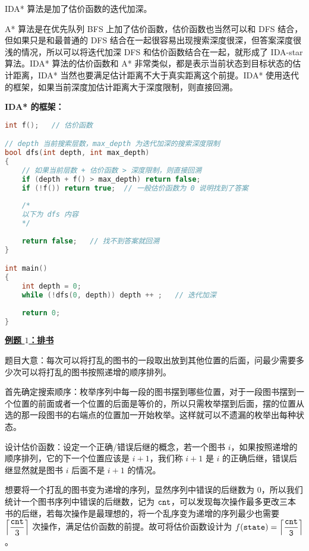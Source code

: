

IDA* 算法是加了估价函数的迭代加深。

A* 算法是在优先队列 BFS 上加了估价函数，估价函数也当然可以和 DFS 结合，但如果只是和最普通的 DFS 结合在一起很容易出现搜索深度很深，但答案深度很浅的情况，所以可以将迭代加深 DFS 和估价函数结合在一起，就形成了 IDA-star 算法。IDA* 算法的估价函数和 A* 非常类似，都是表示当前状态到目标状态的估计距离，IDA* 当然也要满足估计距离不大于真实距离这个前提。IDA* 使用迭代的框架，如果当前深度加估计距离大于深度限制，则直接回溯。

\textbf{IDA* 的框架：}
\begin{lstlisting}[language=cpp]
int f();   // 估价函数

// depth 当前搜索层数，max_depth 为迭代加深的搜索深度限制
bool dfs(int depth, int max_depth)  
{
    // 如果当前层数 + 估价函数 > 深度限制，则直接回溯
    if (depth + f() > max_depth) return false; 
    if (!f()) return true;  // 一般估价函数为 0 说明找到了答案
    
    /*
    以下为 dfs 内容
    */
    
    return false;   // 找不到答案就回溯
}

int main()
{
    int depth = 0;
    while (!dfs(0, depth)) depth ++ ;   // 迭代加深
    
    return 0;
}
\end{lstlisting}

\textbf{\href{http://poj.org/problem?id=3460}{例题 $1$：排书}}

题目大意：每次可以将打乱的图书的一段取出放到其他位置的后面，问最少需要多少次可以将打乱的图书按照递增的顺序排列。

首先确定搜索顺序：枚举序列中每一段的图书摆到哪些位置，对于一段图书摆到一个位置的前面或者一个位置的后面是等价的，所以只需枚举摆到后面，摆的位置从选的那一段图书的右端点的位置加一开始枚举。这样就可以不遗漏的枚举出每种状态。

设计估价函数：设定一个正确/错误后继的概念，若一个图书 $i$，如果按照递增的顺序排列，它的下一个位置应该是 $i + 1$，我们称 $i + 1$ 是 $i$ 的正确后继，错误后继显然就是图书 $i$ 后面不是 $i + 1$ 的情况。

想要将一个打乱的图书变为递增的序列，显然序列中错误的后继数为 $0$，所以我们统计一个图书序列中错误的后继数，记为 $\tt cnt$，可以发现每次操作最多更改三本书的后继，若每次操作是最理想的，将一个乱序变为递增的序列最少也需要 $\left\lceil\dfrac{\tt cnt}{3}\right\rceil$ 次操作，满足估价函数的前提。故可将估价函数设计为 $f(\tt state) = \left\lceil\dfrac{\tt cnt}{3}\right\rceil$。

